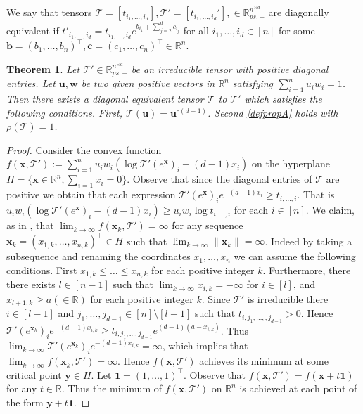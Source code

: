 \documentclass{amsart}
\newcommand{\R}{\mathbb{R}}
\newcommand{\uu}{\mathbf{u}}
\newcommand{\w}{\mathbf{w}}
\newcommand{\x}{\mathbf{x}}
\newcommand{\y}{\mathbf{y}}
\newcommand{\0}{\mathbf{0}}
\newcommand{\1}{\mathbf{1}}
\newcommand{\cT}{\mathcal{T}}
\newcommand{\trans}{^\top}
\newtheorem{theorem}[theo]{Theorem}
\theoremstyle{remark}
\numberwithin{equation}{section} %
\renewcommand{\ge}{\geqslant}
\renewcommand{\le}{\leqslant}
\begin{document}
 We say that tensors $\cT=[t_{i_1,\ldots,i_d}],\cT'=[t_{i_1,\ldots,i_d}'],\in \R_{ps,+}^{n^{\times d}}$ are diagonally equivalent if
 $t'_{i_1,\ldots,i_d}=t_{i_1,\ldots,i_d}e^{b_{i_1}+\sum_{j=2}^d c_{i_j}}$ for all $i_1,\ldots,i_d\in [n]$ for some $\mathbf{b}=(b_1,\ldots,b_n)\trans, \mathbf{c}=(c_1,\ldots,c_n)\trans\in\R^n$.
 \begin{theorem}\label{diagteneqthm}  Let $\cT'\in \R_{ps,+}^{n^{\times d}}$ be an irreducible tensor with positive diagonal entries.
 Let $\uu,\w$ be two given positive vectors in $\R^n$ satisfying $\sum_{i=1}^n u_iw_i=1$. 
 Then there exists a diagonal equivalent tensor $\cT$ to $\cT'$ which satisfies the following conditions.  First, $\cT(\uu)=\uu^{\circ (d-1)}$.
 Second \eqref{defpropA} holds with $\rho(\cT)=1$.
 \end{theorem}
 \begin{proof}  Consider the convex function $f(\x,\cT'):=\sum_{i=1}^n u_iw_i (\log\cT'(e^{\x})_i -(d-1)x_i)$ on the hyperplane $H=\{\x\in\R^n,\sum_{i=1} x_i=0\}$.
 Observe that since the diagonal entries of $\cT$ are positive we obtain that each expression $\cT'(e^{\x})_i e^{-(d-1)x_i}\ge t_{i,\ldots,i}$.  That is $ u_iw_i (\log\cT'(e^{\x})_i -(d-1)x_i)\ge u_iw_i \log t_{i,\ldots,i}$ for each $i\in [n]$.
 We claim, as in \cite{FK75}, that $\lim _{k\to\infty}f(\x_k,\cT')=\infty$ for any sequence $\x_k=(x_{1,k},\ldots,x_{n,k})\trans\in H$ such that $\lim_{k\to\infty} \|\x_{k}\|=\infty$. 
 Indeed by taking a subsequence and renaming the coordinates $x_1,\ldots,x_n$ we can assume the following conditions.  First $x_{1,k}\le \ldots\le x_{n,k}$ for each positive integer $k$.  Furthermore, there there exists $l\in [n-1]$ such that $\lim_{k\to\infty}x_{i,k}=-\infty$ for $i\in[l]$, and $x_{l+1,k}\ge a (\in\R)$  for each positive integer $k$. Since $\cT'$ is irreducible there $i\in[l-1]$ and $j_1,\ldots,j_{d-1}\in[n]\setminus [l-1]$ such that $t_{i,j_1,\ldots,,j_{d-1}}>0$.  Hence
$\cT'(e^{\x_k})_i e^{-(d-1)x_{i,k}}\ge t_{i,j_1,\ldots,j_{d-1}}e^{(d-1)(a-x_{i,k})}$.  Thus
$\lim_{k\to \infty}\cT'(e^{\x_k})_i e^{-(d-1)x_{i,k}}=\infty$, which implies that  $\lim _{k\to\infty}f(\x_k,\cT')=\infty$.  Hence $f(\x,\cT')$ achieves its minimum at some critical point $\y\in H$. Let $\1=(1,\ldots,1)\trans$.  Observe that $f(\x,\cT')=f(\x+t\1)$ for any $t\in\R$.
Thus the minimum of $f(\x,\cT')$ on $\R^n$ is achieved at each point of the form $\y+t\1$.

\end{proof}
\end{document}
